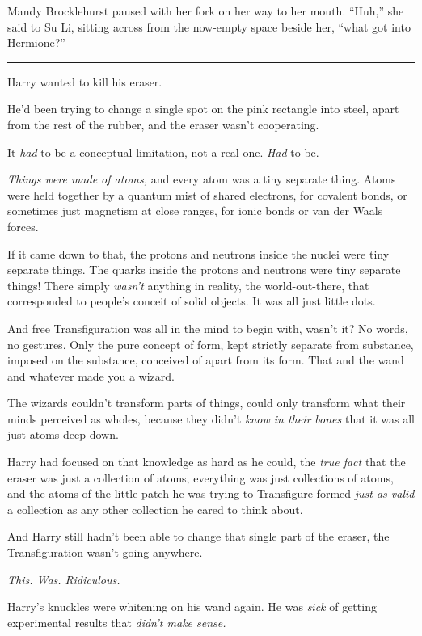 Mandy Brocklehurst paused with her fork on her way to her mouth.
``Huh,'' she said to Su Li, sitting across from the now-empty space
beside her, ``what got into Hermione?''

\begin{center}\rule{3in}{0.4pt}\end{center}

Harry wanted to kill his eraser.

He'd been trying to change a single spot on the pink rectangle into
steel, apart from the rest of the rubber, and the eraser wasn't
cooperating.

It \emph{had} to be a conceptual limitation, not a real one. \emph{Had}
to be.

\emph{Things were made of atoms,} and every atom was a tiny separate
thing. Atoms were held together by a quantum mist of shared electrons,
for covalent bonds, or sometimes just magnetism at close ranges, for
ionic bonds or van der Waals forces.

If it came down to that, the protons and neutrons inside the nuclei were
tiny separate things. The quarks inside the protons and neutrons were
tiny separate things! There simply \emph{wasn't} anything in reality,
the world-out-there, that corresponded to people's conceit of solid
objects. It was all just little dots.

And free Transfiguration was all in the mind to begin with, wasn't it?
No words, no gestures. Only the pure concept of form, kept strictly
separate from substance, imposed on the substance, conceived of apart
from its form. That and the wand and whatever made you a wizard.

The wizards couldn't transform parts of things, could only transform
what their minds perceived as wholes, because they didn't \emph{know in
their bones} that it was all just atoms deep down.

Harry had focused on that knowledge as hard as he could, the \emph{true
fact} that the eraser was just a collection of atoms, everything was
just collections of atoms, and the atoms of the little patch he was
trying to Transfigure formed \emph{just as valid} a collection as any
other collection he cared to think about.

And Harry still hadn't been able to change that single part of the
eraser, the Transfiguration wasn't going anywhere.

\emph{This. Was. Ridiculous.}

Harry's knuckles were whitening on his wand again. He was \emph{sick} of
getting experimental results that \emph{didn't make sense.}


